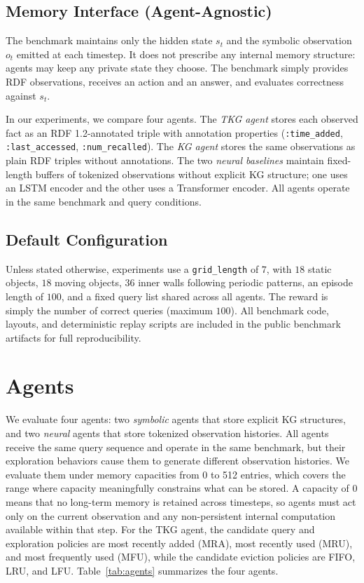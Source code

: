 \documentclass[Afour,sageh,times]{sagej}
\begin{document}
\subsection{Memory Interface (Agent-Agnostic)}

The benchmark maintains only the hidden state $s_t$ and the symbolic observation $o_t$
emitted at each timestep. It does not prescribe any internal memory structure: agents
may keep any private state they choose. The benchmark simply provides RDF
observations, receives an action and an answer, and evaluates correctness against $s_t$.

In our experiments, we compare four agents. The \emph{TKG agent} stores each
observed fact as an RDF 1.2-annotated triple with annotation properties (\texttt{:time\_added},
\texttt{:last\_accessed}, \texttt{:num\_recalled}). The \emph{KG agent} stores the same
observations as plain RDF triples without annotations. The two \emph{neural baselines}
maintain fixed-length buffers of tokenized observations without explicit KG structure;
one uses an LSTM encoder and the other uses a Transformer encoder. All agents operate in
the same benchmark and query conditions.


\subsection{Default Configuration}

Unless stated otherwise, experiments use a \texttt{grid\_length} of $7$, with $18$
static objects, $18$ moving objects, $36$ inner walls following periodic patterns, an
episode length of $100$, and a fixed query list shared across all agents. The reward is
simply the number of correct queries (maximum $100$). All benchmark code, layouts, and
deterministic replay scripts are included in the public benchmark artifacts for full
reproducibility.

\section{Agents}
\label{sec:agents}

We evaluate four agents: two \emph{symbolic} agents that store explicit KG structures,
and two \emph{neural} agents that store tokenized observation histories. All agents
receive the same query sequence and operate in the same benchmark, but their
exploration behaviors cause them to generate different observation histories. We
evaluate them under memory capacities from 0 to 512 entries, which covers the range
where capacity meaningfully constrains what can be stored. A capacity of $0$ means that
no long-term memory is retained across timesteps, so agents must act only on the current
observation and any non-persistent internal computation available within that step.
For the TKG agent, the candidate query and exploration policies are most recently added
(MRA), most recently used (MRU), and most frequently used (MFU), while the candidate
eviction policies are FIFO, LRU, and LFU.
Table~\ref{tab:agents}
summarizes the four agents.
\end{document}

